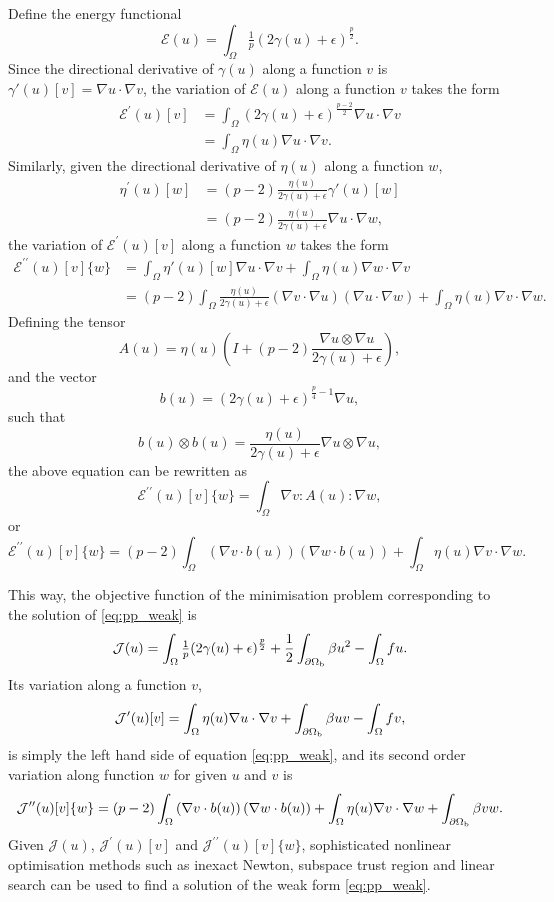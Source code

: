 \documentclass[a4paper,11pt]{scrartcl}
\newcommand{\eq}[1]{\begin{equation} #1 \end{equation}}
\newcommand{\eqs}[1]{\begin{align} #1 \end{align}}
\begin{document}
Define the energy functional
\eq{ \mathcal{E}(u) =  \int_{\Omega} \tfrac{1}{p}  (2\gamma(u) + \epsilon)^{\frac{p}{2}}  .\label{eq:energy}}
%
Since the directional derivative of $\gamma(u)$ along a function $v$ is $ \gamma'(u)[v] = \nabla u \cdot \nabla v$,
%
the variation of $\mathcal{E}(u)$ along a function $v$ takes the form
\eqs{ \mathcal{E}^\prime(u)[v]  & = \int_{\Omega}  (2\gamma(u) + \epsilon)^{\frac{p-2}{2}} \nabla u \cdot \nabla v\\
 & = \int_{\Omega}  \eta(u) \nabla u \cdot \nabla v. }
%
Similarly, given the directional derivative of $\eta(u)$ along a function $w$,
\eqs{
\eta^\prime(u)[w] & = (p-2) \frac{\eta(u)}{2\gamma(u) + \epsilon} \gamma'(u)[w] \nonumber \\
& = (p-2) \frac{\eta(u)}{2\gamma(u) + \epsilon} \nabla u \cdot \nabla w,
}
%
the variation of $\mathcal{E}^\prime(u)[v]$ along a function $w$ takes the form
\eqs{ \mathcal{E}^{\prime\prime}(u)[v]\{w\} & = \int_{\Omega} \eta'(u)[w] \nabla u \cdot \nabla v + \int_{\Omega}  \eta(u) \nabla w \cdot \nabla v \nonumber \\
& = (p-2) \int_{\Omega} \frac{\eta(u)}{2\gamma(u) + \epsilon} (\nabla v \cdot \nabla u)( \nabla u \cdot \nabla w )+ \int_{\Omega} \eta(u) \nabla v \cdot \nabla w .}
Defining the tensor
\eq{
A(u) = \eta(u) \left(I + (p-2)\frac{\nabla u \otimes \nabla u}{2\gamma(u) + \epsilon} \right),
}
and the vector
\eq{
b(u) = \left( 2\gamma(u) + \epsilon \right)^{\frac{p}{4}-1} \nabla u,
}
such that
\eq{
 b(u) \otimes b(u) = \frac{\eta(u)}{2\gamma(u) + \epsilon} \nabla u \otimes \nabla u,
}
the above equation can be rewritten as
\eq{\mathcal{E}^{\prime\prime}(u)[v]\{w\} = \int_{\Omega} \nabla v : A(u) : \nabla w ,}
or
\eq{\mathcal{E}^{\prime\prime}(u)[v]\{w\} = (p-2) \int_{\Omega} \left(\nabla v \cdot b(u)\right) \left( \nabla w\cdot b(u) \right) + \int_{\Omega} \eta(u) \nabla v \cdot \nabla w .}


This way, the objective function of the minimisation problem corresponding to the solution of \eqref{eq:pp_weak} is
\eq{ \mathcal{J}(u) = \int_{\Omega} \tfrac{1}{p}  (2\gamma(u) + \epsilon)^{\frac{p}{2}} + \frac12\int_{\partial\Omega_{\rm b}} \beta u^2  - \int_{\Omega} fu. }
%
Its variation along a function $v$,
\eq{ \mathcal{J}^\prime(u)[v] = \int_{\Omega} \eta(u) \nabla u \cdot \nabla v + \int_{\partial\Omega_{\rm b}} \beta uv  - \int_{\Omega} fv ,}
is simply the left hand side of equation \eqref{eq:pp_weak}, and its second order variation along function $w$ for given $u$ and $v$ is
\eq{\mathcal{J}^{\prime\prime}(u)[v]\{w\}  = (p-2) \int_{\Omega} \left(\nabla v \cdot b(u)\right) \left( \nabla w\cdot b(u) \right) + \int_{\Omega} \eta(u) \nabla v \cdot \nabla w  + \int_{\partial\Omega_{\rm b}} \beta vw .}
%
Given $\mathcal{J}(u)$, $\mathcal{J}^\prime(u)[v]$ and $\mathcal{J}^{\prime\prime}(u)[v]\{w\}$, sophisticated nonlinear optimisation methods such as inexact Newton, subspace trust region and linear search can be used to find a solution of the weak form \eqref{eq:pp_weak}.
\end{document}
